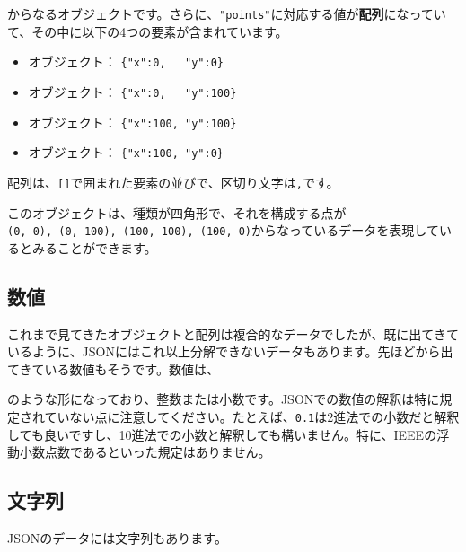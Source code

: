 からなるオブジェクトです。さらに、\texttt{"points"}に対応する値が\textbf{配列}になっていて、その中に以下の4つの要素が含まれています。

\begin{itemize}
\tightlist
\item
  オブジェクト： \texttt{\{"x":0,\ \ \ "y":0\}}
\item
  オブジェクト： \texttt{\{"x":0,\ \ \ "y":100\}}
\item
  オブジェクト： \texttt{\{"x":100,\ "y":100\}}
\item
  オブジェクト： \texttt{\{"x":100,\ "y":0\}}
\end{itemize}

配列は、\texttt{{[}{]}}で囲まれた要素の並びで、区切り文字は\texttt{,}です。

このオブジェクトは、種類が四角形で、それを構成する点が\texttt{(0,\ 0),\ (0,\ 100),\ (100,\ 100),\ (100,\ 0)}からなっているデータを表現しているとみることができます。

\hypertarget{chapter3-ux6570ux5024}{%
\subsection{数値}\label{chapter3-ux6570ux5024}}

これまで見てきたオブジェクトと配列は複合的なデータでしたが、既に出てきているように、JSONにはこれ以上分解できないデータもあります。先ほどから出てきている数値もそうです。数値は、

\begin{Shaded}
\begin{Highlighting}[]
\end{Highlighting}
\end{Shaded}

のような形になっており、整数または小数です。JSONでの数値の解釈は特に規定されていない点に注意してください。たとえば、\texttt{0.1}は2進法での小数だと解釈しても良いですし、10進法での小数と解釈しても構いません。特に、IEEEの浮動小数点数であるといった規定はありません。

\hypertarget{chapter3-ux6587ux5b57ux5217}{%
\subsection{文字列}\label{chapter3-ux6587ux5b57ux5217}}

JSONのデータには文字列もあります。

\begin{Shaded}
\begin{Highlighting}[]
\end{Highlighting}
\end{Shaded}

